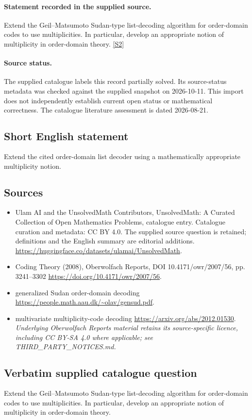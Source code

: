 \documentclass[11pt]{article}
\begin{document}
\paragraph{Statement recorded in the supplied source.}
Extend the Geil–Matsumoto Sudan-type list-decoding algorithm for order-domain codes to use multiplicities. In particular, develop an appropriate notion of multiplicity in order-domain theory. \href{https://doi.org/10.4171/owr/2007/56}{[S2]}
\paragraph{Source status.}
The supplied catalogue labels this record partially solved. Its source-status metadata was checked against the supplied snapshot on 2026-10-11. This import does not independently establish current open status or mathematical correctness. The catalogue literature assessment is dated 2026-08-21.
\subsection{Short English statement}
Extend the cited order-domain list decoder using a mathematically appropriate multiplicity notion.
\subsection{Sources}
\begin{itemize}
\item[S1] Ulam AI and the UnsolvedMath Contributors, UnsolvedMath: A Curated Collection of Open Mathematics Problems, catalogue entry. Catalogue curation and metadata: CC BY 4.0. The supplied source question is retained; definitions and the English summary are editorial additions.
\url{https://huggingface.co/datasets/ulamai/UnsolvedMath}.
\item[S2] Coding Theory (2008), Oberwolfach Reports, DOI 10.4171/owr/2007/56, pp. 3241--3302
\url{https://doi.org/10.4171/owr/2007/56}.
\item[S3] generalized Sudan order-domain decoding
\url{https://people.math.aau.dk/~olav/gensud.pdf}.
\item[S4] multivariate multiplicity-code decoding
\url{https://arxiv.org/abs/2012.01530}.
\textit{Underlying Oberwolfach Reports material retains its source-specific licence, including CC BY-SA 4.0 where applicable; see THIRD\_PARTY\_NOTICES.md.}
\end{itemize}
\subsection{Verbatim supplied catalogue question}
Extend the Geil–Matsumoto Sudan-type list-decoding algorithm for order-domain codes to use multiplicities. In particular, develop an appropriate notion of multiplicity in order-domain theory.
\end{document}
